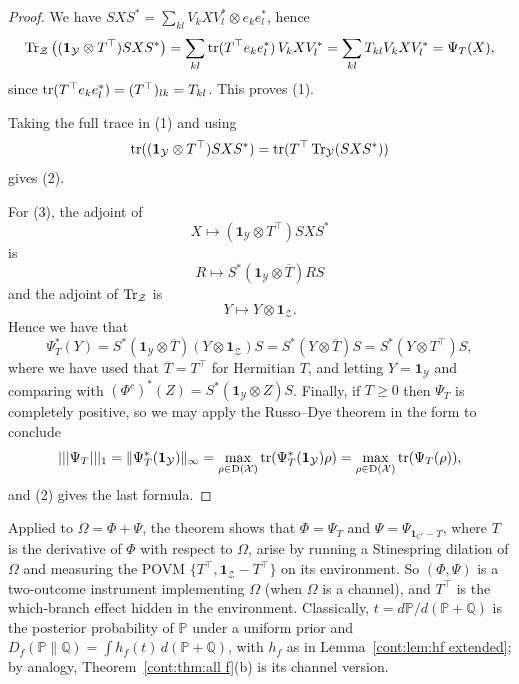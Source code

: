  \begin{proof}
     We have $SXS^*=\sum_{kl}V_kXV_l^*\otimes e_ke_l^*$, hence
     \[\operatorname{Tr}_{\mathcal{Z}}\left((\mathbf{1}_{\mathcal{Y}}\otimes T^\top)SXS^*\right)=\sum_{kl}\operatorname{tr}(T^\top e_ke_l^*)\,V_kXV_l^*=\sum_{kl}T_{kl}V_kXV_l^*=\Psi_T(X),\]
     since $\operatorname{tr}(T^\top e_ke_l^*)=(T^\top)_{lk}=T_{kl}$. This proves (1).

     Taking the full trace in (1) and using \[\operatorname{tr}((\mathbf{1}_{\mathcal{Y}}\otimes T^\top)SXS^*)=\operatorname{tr}(T^\top\operatorname{Tr}_{\mathcal{Y}}(SXS^*))\] gives (2).

     For (3), the adjoint of \[X\mapsto (\mathbf{1}_{\mathcal{Y}}\otimes T^\top)SXS^*\] is \[R\mapsto S^*(\mathbf{1}_{\mathcal{Y}}\otimes \overline{T})RS\] and the adjoint of $\operatorname{Tr}_{\mathcal{Z}}$ is \[Y\mapsto Y\otimes\mathbf{1}_{\mathcal{Z}}.\] Hence we have that
\[
\Psi_T^*(Y)=S^*(\mathbf{1}_{\mathcal{Y}}\otimes \overline{T})(Y\otimes\mathbf{1}_{\mathcal{Z}})S=S^*(Y\otimes \overline{T})S=S^*(Y\otimes T^\top)S,
\]
where we have used that $\overline{T}=T^\top$ for Hermitian $T$, and letting $Y=\mathbf{1}_{\mathcal{Y}}$ and comparing with $(\Phi^c)^*(Z)=S^*(\mathbf{1}_{\mathcal{Y}}\otimes Z)S$. Finally, if $T\geq 0$ then $\Psi_T$ is completely positive, so we may apply the Russo--Dye theorem \cite{RussoDye1966} in the form \cite[Proposition~3.6]{Paulsen2003} to conclude \[|||\Psi_T|||_1=\|\Psi_T^*(\mathbf{1}_{\mathcal{Y}})\|_\infty=\max_{\rho\in \mathrm{D}(\mathcal{X})}\operatorname{tr}(\Psi_T^*(\mathbf{1}_{\mathcal{Y}})\rho)=\max_{\rho\in \mathrm{D}(\mathcal{X})}\operatorname{tr}(\Psi_T(\rho)),\] and (2) gives the last formula.
 \end{proof}
\begin{remark}\label{cont:rem:phys-effect}
Applied to $\Omega=\Phi+\Psi$, the theorem shows that $\Phi=\Psi_T$ and $\Psi=\Psi_{\mathbf{1}_{\mathbb{C}^r}-T}$, where $T$ is the derivative of $\Phi$ with respect to $\Omega$, arise by running a Stinespring dilation of $\Omega$ and measuring the POVM $\{T^\top,\mathbf{1}_{\mathcal{Z}}-T^\top\}$ on its environment. So $(\Phi,\Psi)$ is a two-outcome instrument implementing $\Omega$ (when $\Omega$ is a channel), and $T^\top$ is the which-branch effect hidden in the environment. Classically, $t=d\mathbb{P}/d(\mathbb{P}+\mathbb{Q})$ is the posterior probability of $\mathbb{P}$ under a uniform prior and $D_f(\mathbb{P}\|\mathbb{Q})=\int h_f(t)\,d(\mathbb{P}+\mathbb{Q})$, with $h_f$ as in Lemma~\ref{cont:lem:hf extended}; by analogy, Theorem~\ref{cont:thm:all f}(b) is its channel version.
\end{remark}
 
